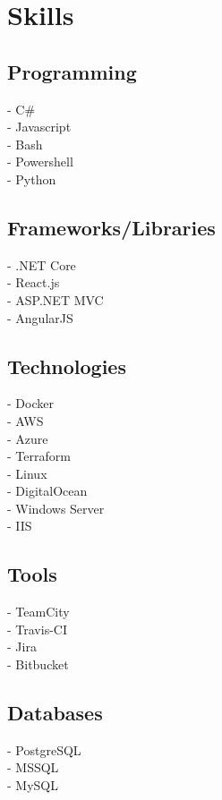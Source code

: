 \documentclass[]{Resume}
\begin{document}
\begin{minipage}[t]{0.33\textwidth}

\section{Skills}
\subsection{Programming}
- C\# \\
- Javascript \\
- Bash \\ 
- Powershell \\
- Python
\sectionsep

\subsection{Frameworks/Libraries}
- .NET Core \\
- React.js \\
- ASP.NET MVC \\
- AngularJS
\sectionsep

\subsection{Technologies}
- Docker \\
- AWS \\ 
- Azure \\
- Terraform \\
- Linux \\
- DigitalOcean \\
- Windows Server \\
- IIS \\
\sectionsep

\subsection{Tools}
- TeamCity \\
- Travis-CI \\
- Jira \\
- Bitbucket 
\sectionsep

\subsection{Databases}
- PostgreSQL \\
- MSSQL \\ 
- MySQL
\sectionsep



%
%

\end{minipage} 
\end{document}
